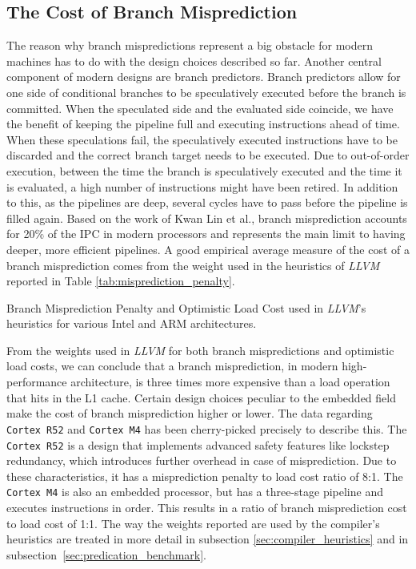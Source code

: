 \subsection{The Cost of Branch Misprediction}
\label{sec:costo_of_branch_prediction}
The reason why branch mispredictions represent a big obstacle for modern machines has to do with the design choices described so far. Another central component of modern designs are branch predictors. Branch predictors allow for one side of conditional branches to be speculatively executed before the branch is committed. When the speculated side and the evaluated side coincide, we have the benefit of keeping the pipeline full and executing instructions ahead of time. When these speculations fail, the speculatively executed instructions have to be discarded and the correct branch target needs to be executed. Due to out-of-order execution, between the time the branch is speculatively executed and the time it is evaluated, a high number of instructions might have been retired. In addition to this, as the pipelines are deep, several cycles have to pass before the pipeline is filled again. Based on the work of Kwan Lin et al.\cite{lin2019branch}, branch misprediction accounts for 20\% of the IPC in modern processors and represents the main limit to having deeper, more efficient pipelines. A good empirical average measure of the cost of a branch misprediction comes from the weight used in the heuristics of \textit{LLVM}\cite{Lattner2004LLVM} reported in Table \ref{tab:misprediction_penalty}.

\begin{table}[H]
    \captionsetup{type=table}
    \centering
    
    \caption[Branch Misprediction Penalty]{Branch Misprediction Penalty and Optimistic Load Cost used in \textit{LLVM}'s heuristics for various Intel and ARM architectures.}
    \label{tab:misprediction_penalty}
\end{table}

\newpage

From the weights used in \textit{LLVM} for both branch mispredictions and optimistic load costs, we can conclude that a branch misprediction, in modern high-performance architecture, is three times more expensive than a load operation that hits in the L1 cache. Certain design choices peculiar to the embedded field make the cost of branch misprediction higher or lower. The data regarding \texttt{Cortex R52} and \texttt{Cortex M4} has been cherry-picked precisely to describe this. The \texttt{Cortex R52} is a design that implements advanced safety features like lockstep redundancy, which introduces further overhead in case of misprediction. Due to these characteristics, it has a misprediction penalty to load cost ratio of 8:1. The \texttt{Cortex M4} is also an embedded processor, but has a three-stage pipeline and executes instructions in order. This results in a ratio of branch misprediction cost to load cost of 1:1. The way the weights reported are used by the compiler's heuristics are treated in more detail in subsection \ref{sec:compiler_heuristics} and in subsection~\ref{sec:predication_benchmark}.

